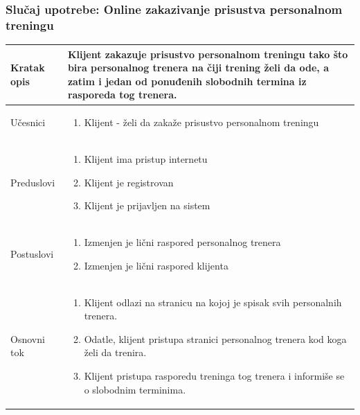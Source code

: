 \subsubsection{Slučaj upotrebe: Online zakazivanje prisustva personalnom treningu}

\begin{longtable}{| p{} | p{} |} 
\hline
    Kratak opis & Klijent zakazuje prisustvo personalnom treningu tako što bira personalnog trenera na čiji trening želi da ode, a zatim i jedan od ponuđenih slobodnih termina iz rasporeda tog trenera. \\ 
\hline    
    Učesnici & 
    \begin{enumerate}
    \item  Klijent - želi da zakaže prisustvo personalnom treningu
    \end{enumerate}\\
\hline
   Preduslovi & 
   \begin{enumerate}
    \item Klijent ima pristup internetu
    \item Klijent je registrovan
    \item Klijent je prijavljen na sistem
   \end{enumerate} \\
\hline  
    Postuslovi & 
    \begin{enumerate}
    \item Izmenjen je lični raspored personalnog trenera
    \item Izmenjen je lični raspored klijenta
   \end{enumerate} \\
\hline
    Osnovni tok &
    \begin{enumerate}
    \item Klijent odlazi na stranicu na kojoj je spisak svih personalnih trenera.
    \item Odatle, klijent pristupa stranici personalnog trenera kod koga želi da trenira.
    \item Klijent pristupa rasporedu treninga tog trenera i informiše se o slobodnim terminima. 
    

\end{enumerate}
\end{longtable}
